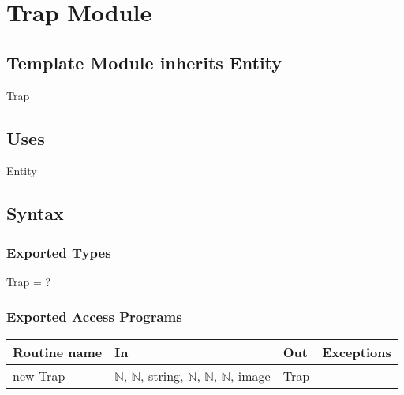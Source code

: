 \documentclass[12pt]{article}
\begin{document}
\newpage

\section*{Trap Module} %



\subsection*{Template Module inherits Entity}

Trap

\subsection*{Uses}

Entity

\subsection*{Syntax}



\subsubsection*{Exported Types}

Trap = ?

\subsubsection*{Exported Access Programs}

\begin{tabular}{| l | l | l | l |}
\hline
\textbf{Routine name} & \textbf{In} & \textbf{Out} & \textbf{Exceptions}\\
\hline
new Trap & $\mathbb{N}$, $\mathbb{N}$, string, $\mathbb{N}$, $\mathbb{N}$, $\mathbb{N}$, image & Trap & ~\\
\hline
\end{tabular}
\end{document}
